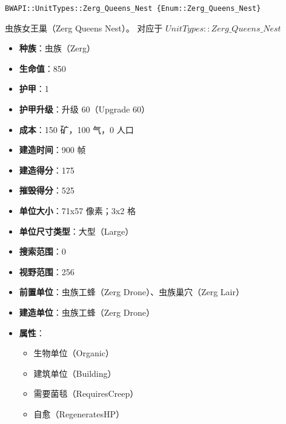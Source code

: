 \begin{tcolorbox}[colback=white, colframe=black!60!white, title=Zerg\_Queens\_Nest(), arc=0mm]
    \begin{verbatim}
BWAPI::UnitTypes::Zerg_Queens_Nest {Enum::Zerg_Queens_Nest}
    \end{verbatim}
    虫族女王巢（Zerg Queens Nest）。
    对应于  $UnitTypes::Zerg\_Queens\_Nest$ 
    \begin{itemize}
        \item \textbf{种族}：虫族（Zerg）
        \item \textbf{生命值}：850
        \item \textbf{护甲}：1
        \item \textbf{护甲升级}：升级 60（Upgrade 60）
        \item \textbf{成本}：150 矿，100 气，0 人口
        \item \textbf{建造时间}：900 帧
        \item \textbf{建造得分}：175
        \item \textbf{摧毁得分}：525
        \item \textbf{单位大小}：71x57 像素；3x2 格
        \item \textbf{单位尺寸类型}：大型（Large）
        \item \textbf{搜索范围}：0
        \item \textbf{视野范围}：256
        \item \textbf{前置单位}：虫族工蜂（Zerg Drone）、虫族巢穴（Zerg Lair）
        \item \textbf{建造单位}：虫族工蜂（Zerg Drone）
        \item \textbf{属性}：
            \begin{itemize}
                \item 生物单位（Organic）
                \item 建筑单位（Building）
                \item 需要菌毯（RequiresCreep）
                \item 自愈（RegeneratesHP）
            \end{itemize}
    \end{itemize}
\end{tcolorbox}


